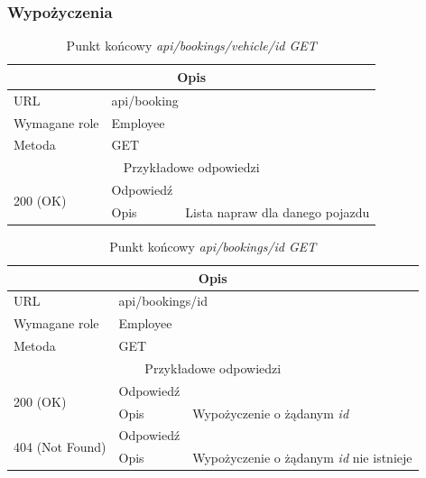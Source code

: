 \documentclass[eng,printmode,openany]{mgr}
\begin{document}
\subsubsection{Wypożyczenia}
\begin{table}[H]
	\caption{Punkt końcowy \textit{api/bookings/vehicle/id GET}}
	\begin{tabularx}{\textwidth}{|l|l|X|}
		\hline
		\multicolumn{3}{|c|}{Opis}                         						\\ \hline
		URL                       & \multicolumn{2}{l|}{api/booking} 	    	\\ \hline
		Wymagane role             & \multicolumn{2}{l|}{Employee}               \\ \hline
		Metoda                    & \multicolumn{2}{l|}{GET} 					\\ \hline
		\multicolumn{3}{|c|}{ Przykładowe odpowiedzi}                   		\\ \hline
		\multirow{2}{*}{200 (OK)} 			& Odpowiedź     &      		\\ \cline{2-3} 
		& Opis         	& Lista napraw dla danego pojazdu		      		                                \\ \hline
	\end{tabularx}
\end{table}

\begin{table}[H]
	\caption{Punkt końcowy \textit{api/bookings/id GET}}
	\begin{tabularx}{\textwidth}{|l|l|X|}
		\hline
		\multicolumn{3}{|c|}{Opis}                         						\\ \hline
		URL                       & \multicolumn{2}{l|}{api/bookings/id} 	\\ \hline
		Wymagane role             & \multicolumn{2}{l|}{Employee}               \\ \hline
		Metoda                    & \multicolumn{2}{l|}{GET} 					\\ \hline
		\multicolumn{3}{|c|}{ Przykładowe odpowiedzi}                   		\\ \hline
		\multirow{2}{*}{200 (OK)} 			& Odpowiedź    	&       	\\ \cline{2-3} 
		& Opis         	& Wypożyczenie o żądanym \textit{id}      									            \\ \hline
		\multirow{2}{*}{404 (Not Found)} 	& Odpowiedź     &     \\ \cline{2-3} 
		& Opis          & Wypożyczenie o żądanym \textit{id} nie istnieje      								    \\ \hline
	\end{tabularx}
\end{table}
\end{document}
